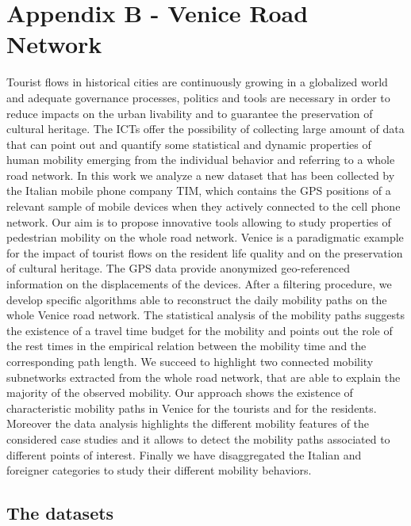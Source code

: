 \documentclass{standalone}
\begin{document}
\chapter*{Appendix B - Venice Road Network}

Tourist flows in historical cities are continuously growing in a globalized world and adequate governance processes, politics and tools are necessary in order to reduce impacts on the urban livability and to guarantee the preservation of cultural heritage.
The ICTs offer the possibility of collecting large amount of data that can point out and quantify some statistical and dynamic properties of human mobility emerging from the individual behavior and referring to a whole road network.
In this work we analyze a new dataset that has been collected by the Italian mobile phone company TIM, which contains the GPS positions of a relevant sample of mobile devices when they actively connected to the cell phone network.
Our aim is to propose innovative tools allowing to study properties of pedestrian mobility on the whole road network.
Venice is a paradigmatic example for the impact of tourist flows on the resident life quality and on the preservation of cultural heritage.
The GPS data provide anonymized geo-referenced information on the displacements of the devices.
After a filtering procedure, we develop specific algorithms able to reconstruct the daily mobility paths on the whole Venice road network.
The statistical analysis of the mobility paths suggests the existence of a travel time budget for the mobility and points out the role of the rest times in the empirical relation between the mobility time and the corresponding path length.
We succeed to highlight two connected mobility subnetworks extracted from the whole road network, that are able to explain the majority of the observed mobility.
Our approach shows the existence of characteristic mobility paths in Venice for the tourists and for the residents.
Moreover the data analysis highlights the different mobility features of the considered case studies and it allows to detect the mobility paths associated to different points of interest.
Finally we have disaggregated the Italian and foreigner categories to study their different mobility behaviors.



\section*{The datasets}
\end{document}
